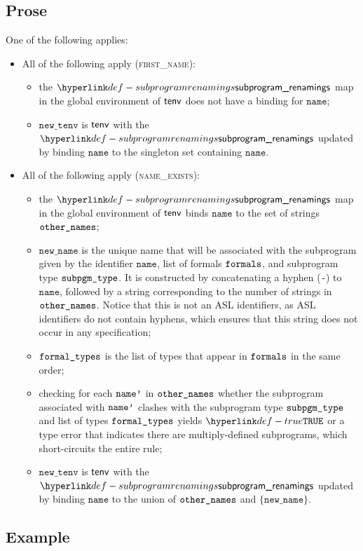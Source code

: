 \documentclass{book}
\newcommand\newtenv[0]{\texttt{new\_tenv}}
\newcommand\name[0]{\texttt{name}}
\newcommand\newname[0]{\texttt{new\_name}}
\begin{document}
\subsection{Prose}
One of the following applies:
\begin{itemize}
  \item All of the following apply (\textsc{first\_name}):
  \begin{itemize}
    \item the $\subprogramrenamings$ map in the global environment of $\textsf{tenv}$ does not have a binding for $\name$;
    \item $\newtenv$ is $\textsf{tenv}$ with the $\subprogramrenamings$ updated by binding $\name$ to the singleton set containing
          $\name$.
  \end{itemize}

  \item All of the following apply (\textsc{name\_exists}):
  \begin{itemize}
    \item the $\subprogramrenamings$ map in the global environment of $\textsf{tenv}$ binds $\name$ to the set of strings $\texttt{other\_names}$;
    \item $\newname$ is the unique name that will be associated with the subprogram given by the identifier $\name$, list of formals $\texttt{formals}$,
          and subprogram type $\texttt{subpgm\_type}$. It is constructed by concatenating a hyphen (\texttt{-}) to $\name$, followed
          by a string corresponding to the number of strings in $\texttt{other\_names}$.
          Notice that this is not an ASL identifiers, as ASL identifiers do not contain hyphens, which ensures that this string
          does not occur in any specification;
    \item $\texttt{formal\_types}$ is the list of types that appear in $\texttt{formals}$ in the same order;
    \item checking for each $\texttt{name'}$ in $\texttt{other\_names}$ whether the subprogram associated with $\texttt{name'}$ clashes
          with the subprogram type $\texttt{subpgm\_type}$ and list of types $\texttt{formal\_types}$ yields $\True$
          or a type error that indicates there are multiply-defined subprograms, which short-circuits the entire rule;
    \item $\newtenv$ is $\textsf{tenv}$ with the $\subprogramrenamings$ updated by binding $\name$ to the union of $\texttt{other\_names}$ and
          $\{\newname\}$.
  \end{itemize}
\end{itemize}

\subsection{Example}
\end{document}
